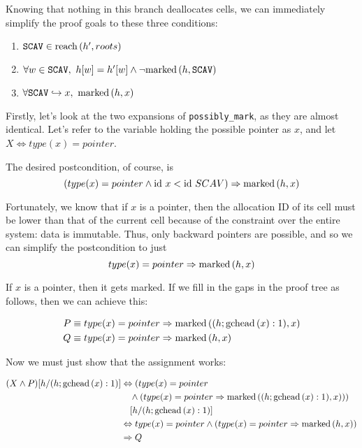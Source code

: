 \begin{lemma}
  Knowing that nothing in this branch deallocates cells, we can
  immediately simplify the proof goals to these three conditions:

  \begin{enumerate}
    \item $\mathtt{SCAV} \in \reach{h'}{roots}$
    \item $\forall w \in \mathtt{SCAV},\ h[w] = h'[w] \land
      \lnot\marked{h}{\mathtt{SCAV}}$
    \item $\forall \mathtt{SCAV} \pointsto x,\ \marked{h}{x}$
  \end{enumerate}

  Firstly, let's look at the two expansions of \texttt{possibly\_mark},
  as they are almost identical. Let's refer to the variable holding
  the possible pointer as $x$, and let $X \iff type(x) = pointer$.

  \begin{prooftree}

  \end{prooftree}

  The desired postcondition, of course, is \[(type(x) = pointer \land
  \id~x < \id~SCAV) \implies \marked{h}{x}\]

  Fortunately, we know that if $x$ is a pointer, then the allocation
  ID of its cell must be lower than that of the current cell because
  of the constraint over the entire system: data is immutable. Thus,
  only backward pointers are possible, and so we can simplify the
  postcondition to just \[type(x) = pointer \implies \marked{h}{x}\]

  If $x$ is a pointer, then it gets marked. If we fill in the gaps in
  the proof tree as follows, then we can achieve this:

  \begin{align*}
    P &\equiv type(x) = pointer \implies \marked{(h; \gchead{x}:1)}{x}\\
    Q &\equiv type(x) = pointer \implies \marked{h}{x}
  \end{align*}

  Now we must just show that the assignment works:

  \begin{align*}
    (X \land P)[h/(h; \gchead{x}:1)] &\iff (type(x) = pointer\\
    &\quad\land (type(x) = pointer \implies \marked{(h;
      \gchead{x}:1)}{x}))\\
    &\quad[h/(h; \gchead{x}:1)]\\
%
    &\iff type(x) = pointer \land (type(x) = pointer \implies
    \marked{h}{x})\\
%
    &\implies Q
  \end{align*}


\end{lemma}

